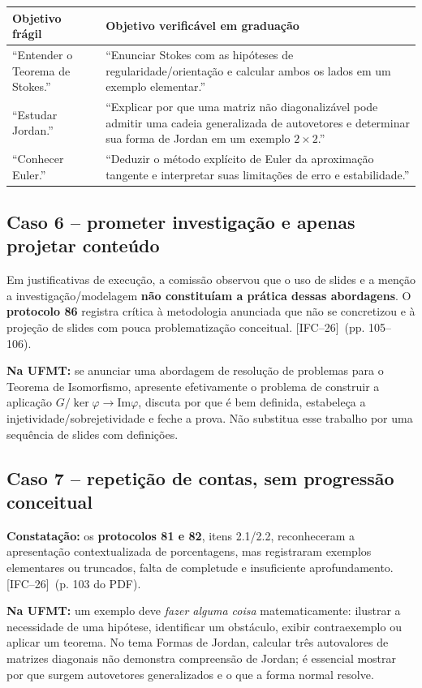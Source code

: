 \documentclass[11pt,a4paper]{article}
\newcommand{\fifc}{\textsf{[IFC--26]}}
\begin{document}
\begin{tabularx}{\textwidth}{p{}X}
\toprule
\textbf{Objetivo frágil} & \textbf{Objetivo verificável em graduação}\\\midrule
``Entender o Teorema de Stokes.'' & ``Enunciar Stokes com as hipóteses de regularidade/orientação e calcular ambos os lados em um exemplo elementar.''\\
``Estudar Jordan.'' & ``Explicar por que uma matriz não diagonalizável pode admitir uma cadeia generalizada de autovetores e determinar sua forma de Jordan em um exemplo $2\times2$.''\\
``Conhecer Euler.'' & ``Deduzir o método explícito de Euler da aproximação tangente e interpretar suas limitações de erro e estabilidade.''\\\bottomrule
\end{tabularx}

\subsection{Caso 6 -- prometer investigação e apenas projetar conteúdo}
Em justificativas de execução, a comissão observou que o uso de slides e a menção a investigação/modelagem \textbf{não constituíam a prática dessas abordagens}. O \textbf{protocolo 86} registra crítica à metodologia anunciada que não se concretizou e à projeção de slides com pouca problematização conceitual. \fifc\ (pp. 105--106).

\textbf{Na UFMT:} se anunciar uma abordagem de resolução de problemas para o Teorema de Isomorfismo, apresente efetivamente o problema de construir a aplicação $G/\ker\varphi\to\mathrm{Im}\varphi$, discuta por que é bem definida, estabeleça a injetividade/sobrejetividade e feche a prova. Não substitua esse trabalho por uma sequência de slides com definições.

\subsection{Caso 7 -- repetição de contas, sem progressão conceitual}
\textbf{Constatação:} os \textbf{protocolos 81 e 82}, itens 2.1/2.2, reconheceram a apresentação contextualizada de porcentagens, mas registraram exemplos elementares ou truncados, falta de completude e insuficiente aprofundamento. \fifc\ (p. 103 do PDF).

\textbf{Na UFMT:} um exemplo deve \emph{fazer alguma coisa} matematicamente: ilustrar a necessidade de uma hipótese, identificar um obstáculo, exibir contraexemplo ou aplicar um teorema. No tema Formas de Jordan, calcular três autovalores de matrizes diagonais não demonstra compreensão de Jordan; é essencial mostrar por que surgem autovetores generalizados e o que a forma normal resolve.
\end{document}
